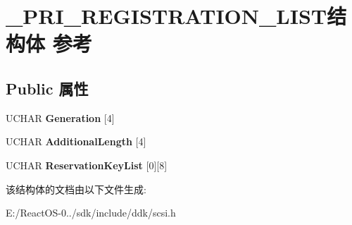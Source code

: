 \hypertarget{struct___p_r_i___r_e_g_i_s_t_r_a_t_i_o_n___l_i_s_t}{}\section{\+\_\+\+P\+R\+I\+\_\+\+R\+E\+G\+I\+S\+T\+R\+A\+T\+I\+O\+N\+\_\+\+L\+I\+S\+T结构体 参考}
\label{struct___p_r_i___r_e_g_i_s_t_r_a_t_i_o_n___l_i_s_t}
\subsection*{Public 属性}
\begin{DoxyCompactItemize}
\item 
\mbox{\label{struct___p_r_i___r_e_g_i_s_t_r_a_t_i_o_n___l_i_s_t_abfd5584351c1d5ca123f8a60427e53cf}} 
U\+C\+H\+AR {\bfseries Generation} \mbox{[}4\mbox{]}
\item 
\mbox{\label{struct___p_r_i___r_e_g_i_s_t_r_a_t_i_o_n___l_i_s_t_a26c3dff2da7718aa0732edeed8e0c47e}} 
U\+C\+H\+AR {\bfseries Additional\+Length} \mbox{[}4\mbox{]}
\item 
\mbox{\label{struct___p_r_i___r_e_g_i_s_t_r_a_t_i_o_n___l_i_s_t_a0f034472640689727e17ad57ddd24575}} 
U\+C\+H\+AR {\bfseries Reservation\+Key\+List} \mbox{[}0\mbox{]}\mbox{[}8\mbox{]}
\end{DoxyCompactItemize}


该结构体的文档由以下文件生成\+:\begin{DoxyCompactItemize}
\item 
E\+:/\+React\+O\+S-\/0../sdk/include/ddk/scsi.\+h\end{DoxyCompactItemize}

